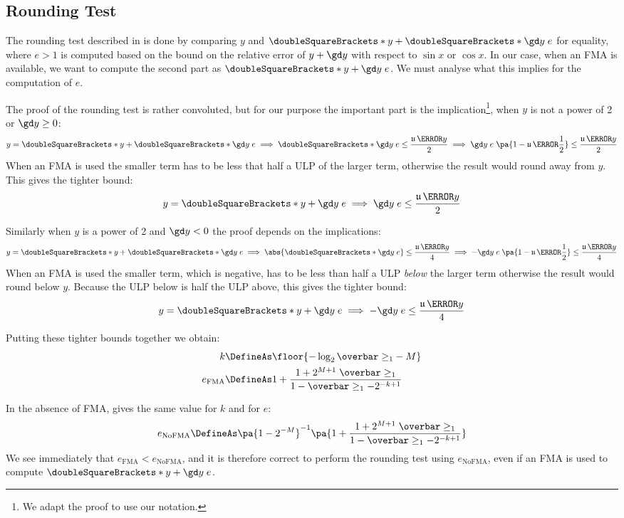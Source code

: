\documentclass[10pt, a4paper, twoside]{basestyle}
\DeclareMathOperator{\ULP}{\mathfrak u}
\newcommand{\round}[1]{\doubleSquareBrackets*{#1}}
\begin{document}
\subsection*{Rounding Test}

The rounding test described in \cite[397-400]{MullerBrisebarreDeDinechinJeannerodLefevreMelquiondRevolStehleTorres2010} is done by comparing $y$ and $\round{y + \round{\gd y \; e}}$ for equality, where $e > 1$ is computed based on the bound on the relative error of $y + \gd y$ with respect to $\sin x$ or $\cos x$.  In our case, when an FMA is available, we want to compute the second part as $\round{y + \gd y \; e}$.  We must analyse what this implies for the computation of $e$.

The proof of the rounding test is rather convoluted, but for our purpose the important part is the implication\footnote{We adapt the proof to use our notation.}, when $y$ is not a power of 2 or $\gd y \geq 0$:
\[
y = \round{y + \round{\gd y \; e}} \implies \round{\gd y \; e} \le \frac{\ULP\of{y}}{2} \implies \gd y \; e \; \pa{1 - \ULP\of{\frac{1}{2}}} \le \frac{\ULP\of{y}}{2}
\]
When an FMA is used the smaller term has to be less that half a ULP of the larger term, otherwise the result would round away from $y$.  This gives the tighter bound:
\[
y = \round{y + \gd y \; e} \implies \gd y \; e \le \frac{\ULP\of{y}}{2}
\]

Similarly when $y$ is a power of 2 and $\gd y < 0$ the proof depends on the implications:
\[
y = \round{y + \round{\gd y \; e}} \implies \abs{\round{\gd y \; e}} \le \frac{\ULP\of{y}}{4} \implies -\gd y \; e \; \pa{1 - \ULP\of{\frac{1}{2}}} \le \frac{\ULP\of{y}}{4}
\]
When an FMA is used the smaller term, which is negative, has to be less than half a ULP \emph{below} the larger term otherwise the result would round below $y$.  Because the ULP below is half the ULP above, this gives the tighter bound:
\[
y = \round{y + \gd y \; e} \implies -\gd y \; e \le \frac{\ULP\of{y}}{4}
\]

Putting these tighter bounds together we obtain:
\begin{align*}
k &\DefineAs \floor{-\log_2{\overbar\ge_1} - M} \\
e_{\text{FMA}} &\DefineAs 1 + \frac{1 + 2^{M + 1} \; \overbar\ge_1}{1 - \overbar\ge_1 - 2^{-k + 1}}
\end{align*}

In the absence of FMA, \cite{MullerBrisebarreDeDinechinJeannerodLefevreMelquiondRevolStehleTorres2010} gives the same value for $k$ and for $e$:
\[
e_{\text{NoFMA}} \DefineAs \pa{1 - 2^{-M}}^{-1}\pa{1 + \frac{1 + 2^{M + 1} \; \overbar\ge_1}{1 - \overbar\ge_1 - 2^{-k + 1}}}
\]
We see immediately that $e_{\text{FMA}} < e_{\text{NoFMA}}$, and it is therefore correct to perform the rounding test using $e_{\text{NoFMA}}$, even if an FMA is used to compute $\round{y + \gd y \; e}$.
\end{document}
